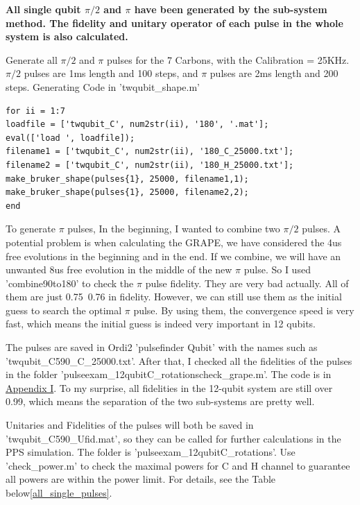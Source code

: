 \textbf{All single qubit $\pi/2$ and $\pi$ have been generated by the sub-system method. The fidelity and unitary operator of each pulse in the whole system is also calculated.}

Generate all $\pi/2$ and $\pi$ pulses for the 7 Carbons, with the Calibration = 25KHz. $\pi/2$ pulses are 1ms length and 100 steps, and $\pi$ pulses are 2ms length and 200 steps. Generating Code in 'twqubit\_shape.m'

\begin{lstlisting}
for ii = 1:7
loadfile = ['twqubit_C', num2str(ii), '180', '.mat'];
eval(['load ', loadfile]);
filename1 = ['twqubit_C', num2str(ii), '180_C_25000.txt'];
filename2 = ['twqubit_C', num2str(ii), '180_H_25000.txt'];
make_bruker_shape(pulses{1}, 25000, filename1,1);
make_bruker_shape(pulses{1}, 25000, filename2,2);
end
\end{lstlisting}

To generate $\pi$ pulses, In the beginning, I wanted to combine two $\pi/2$ pulses. A potential problem is when calculating the GRAPE, we have considered the 4us free evolutions in the beginning and in the end. If we combine, we will have an unwanted 8us free evolution in the middle of the new $\pi$ pulse. So I used 'combine90to180' to check the $\pi$ pulse fidelity. They are very bad actually. All of them are just 0.75~0.76 in fidelity. However, we can still use them as the initial guess to search the optimal $\pi$ pulse. By using them, the convergence speed is very fast, which means the initial guess is indeed very important in 12 qubits.

The pulses are saved in Ordi2 '\dir pulsefinder Qubit\dir' with the names such as 'twqubit\_C590\_C\_25000.txt'. After that, 
I checked all the fidelities of the pulses in the folder '\dir pulseexam\_12qubit\dir C\_rotations\dir check\_grape.m'. The code is in \hyperlink{code:check_grape}{Appendix I}. To my surprise, all fidelities in the 12-qubit system are still over 0.99, which means the separation of the two sub-systems are pretty well.

Unitaries and Fidelities of the pulses will both be saved in 'twqubit\_C590\_Ufid.mat', so they can be called for further calculations in the PPS simulation. The folder is '\dir pulseexam\_12qubit\dir C\_rotations\dir'. Use 'check\_power.m' to check the maximal powers for C and H channel to guarantee all powers are within the power limit. For details, see the Table below\ref{all_single_pulses}. 

